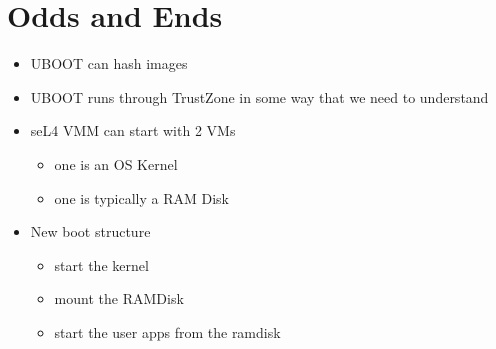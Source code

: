 \documentclass[11pt]{article}
\newcommand{\squash}{\parskip=0pt\itemsep=0pt}
\begin{document}
\section{Odds and Ends}

\begin{itemize}
  \squash
\item UBOOT can hash images
\item UBOOT runs through TrustZone in some way that we need to
  understand
\item seL4 VMM can start with 2 VMs
  \begin{itemize}
    \squash
  \item one is an OS Kernel
  \item one is typically a RAM Disk
  \end{itemize}
\item New boot structure
  \begin{itemize}
    \squash
  \item start the kernel
  \item mount the RAMDisk
  \item start the user apps from the ramdisk
  \end{itemize}
\end{itemize}
\end{document}
